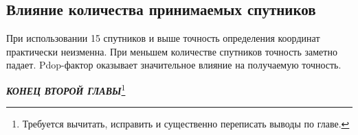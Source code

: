 \subsection*{Влияние количества принимаемых спутников}\label{subsec:ch2/sec4/sub-6}

При использовании 15 спутников и выше точность определения координат практически неизменна. При меньшем количестве спутников точность заметно падает. Pdop-фактор оказывает значительное влияние на получаемую точность.


\textbf{\textit{КОНЕЦ ВТОРОЙ ГЛАВЫ}}\footnote{Требуется вычитать, исправить и существенно переписать выводы по главе. }

